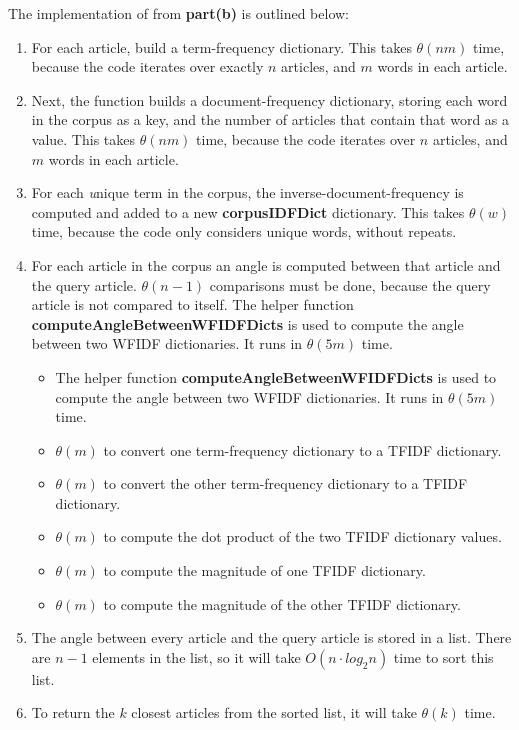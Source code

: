 \documentclass[12pt,twoside]{article}
\begin{document}
\begin{problems}
\begin{problemparts}
The implementation of {\bf \functionb} from {\bf part(b)} is outlined below:
\begin{enumerate}
	\item For each article, build a term-frequency dictionary. This takes $\theta(nm)$ time, because the code iterates over exactly $n$ articles, and $m$ words in each article.
	\item Next, the function builds a document-frequency dictionary, storing each word in the corpus as a key, and the number of articles that contain that word as a value. This takes $\theta(nm)$ time, because the code iterates over $n$ articles, and $m$ words in each article.
	\item For each {\textit unique} term in the corpus, the inverse-document-frequency is computed and added to a new {\bf corpusIDFDict} dictionary. This takes $\theta(w)$ time, because the code only considers unique words, without repeats.
	\item For each article in the corpus an angle is computed between that article and the query article. $\theta(n-1)$ comparisons must be done, because the query article is not compared to itself. The helper function {\bf computeAngleBetweenWFIDFDicts} is used to compute the angle between two WFIDF dictionaries. It runs in $\theta(5m)$ time.
		\begin{itemize}
			\item The helper function {\bf computeAngleBetweenWFIDFDicts} is used to compute the angle between two WFIDF dictionaries. It runs in $\theta(5m)$ time.
			\item $\theta(m)$ to convert one term-frequency dictionary to a TFIDF dictionary.
			\item $\theta(m)$ to convert the other term-frequency dictionary to a TFIDF dictionary.
			\item $\theta(m)$ to compute the dot product of the two TFIDF dictionary values.
			\item $\theta(m)$ to compute the magnitude of one TFIDF dictionary.
			\item $\theta(m)$ to compute the magnitude of the other TFIDF dictionary.
		\end{itemize}
	\item The angle between every article and the query article is stored in a list. There are $n-1$ elements in the list, so it will take $O(n \cdot log_2n)$ time to sort this list.
	\item To return the $k$ closest articles from the sorted list, it will take $\theta(k)$ time.
\end{enumerate}


\end{problemparts}
\end{problems}
\end{document}
